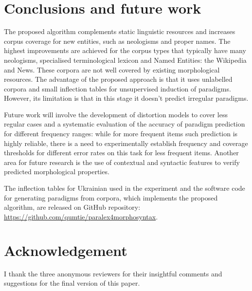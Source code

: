 \documentclass[11pt,a4paper]{article}
\begin{document}
\section{Conclusions and future work}
\label{sec:Conclusions}


The proposed algorithm complements static linguistic resources and increases corpus coverage for new entities, such as neologisms and proper names. The highest improvements are achieved for the corpus types that typically have many neologisms, specialised terminological lexicon and Named Entities: the Wikipedia and News. These corpora are not well covered by existing morphological resources. The advantage of the proposed approach is that it uses unlabelled corpora and small inflection tables for unsupervised induction of paradigms. However, its limitation is that in this stage it doesn't predict irregular paradigms. 

Future work will involve the development of distortion models to cover less regular cases and a systematic evaluation of the accuracy of paradigm prediction for different frequency ranges: while for more frequent items such prediction is highly reliable, there is a need to experimentally establish frequency and coverage thresholds for different error rates on this task for less frequent items. Another area for future research is the use of contextual and syntactic features to verify predicted morphological properties.

The inflection tables for Ukrainian used in the experiment and the software code for generating paradigms from corpora, which implements the proposed algorithm, are released on GitHub repository: \url{https://github.com/qumtie/paralex4morphosyntax}. 

\section{Acknowledgement}
\label{sec:Acknowledgement}
I thank the three anonymous reviewers for their insightful comments and suggestions for the final version of this paper.




\end{document}

